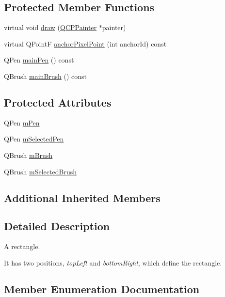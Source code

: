 \subsection*{Protected Member Functions}
\begin{DoxyCompactItemize}
\item 
virtual void \hyperlink{class_q_c_p_item_rect_a18cd583638b876cdd50f1a155ec182aa}{draw} (\hyperlink{class_q_c_p_painter}{Q\+C\+P\+Painter} $\ast$painter)
\item 
virtual Q\+Point\+F \hyperlink{class_q_c_p_item_rect_ae0973f8281fb52361b0c99ee899be07e}{anchor\+Pixel\+Point} (int anchor\+Id) const 
\item 
Q\+Pen \hyperlink{class_q_c_p_item_rect_afa0fb7c6328a1e197ecd537de36daf8f}{main\+Pen} () const 
\item 
Q\+Brush \hyperlink{class_q_c_p_item_rect_ab0bd8e272e822ec851ba5b0c20e9200e}{main\+Brush} () const 
\end{DoxyCompactItemize}
\subsection*{Protected Attributes}
\begin{DoxyCompactItemize}
\item 
Q\+Pen \hyperlink{class_q_c_p_item_rect_aa0d49323628d6752026056bfb52afd86}{m\+Pen}
\item 
Q\+Pen \hyperlink{class_q_c_p_item_rect_a73cc0bee61de3c67221ec8c7a76a29ed}{m\+Selected\+Pen}
\item 
Q\+Brush \hyperlink{class_q_c_p_item_rect_a2d7f207fada27588b3a52b19234d3c2e}{m\+Brush}
\item 
Q\+Brush \hyperlink{class_q_c_p_item_rect_a21b70eee59b6e19ae0bbdf037b13508f}{m\+Selected\+Brush}
\end{DoxyCompactItemize}
\subsection*{Additional Inherited Members}


\subsection{Detailed Description}
A rectangle. 

 It has two positions, {\itshape top\+Left} and {\itshape bottom\+Right}, which define the rectangle. 

\subsection{Member Enumeration Documentation}
\hypertarget{class_q_c_p_item_rect_af0ebba58e6bca4851c4db726691ec0d3}{}
